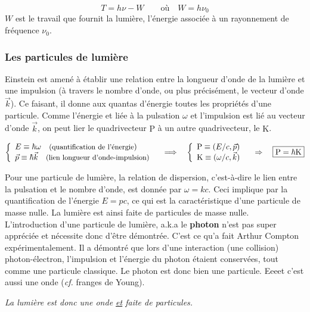 \documentclass[12pt, a4paper]{book}
\begin{document}
$$ T = h\nu - W \qquad \text{où} \quad W = h\nu_0 $$
$W$ est le travail que fournit la lumière, l'énergie associée à un rayonnement de fréquence $\nu_0$.

\subsubsection{Les particules de lumière}
Einstein est amené à établir une relation entre la longueur d'onde de la lumière et une impulsion (à travers le nombre d'onde, ou plus précisément, le vecteur d'onde $\vec{k}$). Ce faisant, il donne aux quantas d'énergie toutes les propriétés d'une particule. Comme l'énergie et liée à la pulsation $\omega$ et l'impulsion est lié au vecteur d'onde $\vec{k}$, on peut lier le quadrivecteur $\mathrm{P}$ à un autre quadrivecteur, le  $\mathrm{K}$.
\begin{center}
$\left\{ \begin{array}{l}
E \equiv \hbar \omega \quad \text{\small (quantification de l'énergie}) \\
\vec{p} \equiv \hbar \vec{k}  \quad \text{\small (lien longueur d'onde-impulsion)}
\end{array} \right.
\quad \Longrightarrow \quad 
\left\{ \begin{array}{l}
\mathrm{P} \equiv (E/c, \vec{p}) \\
\mathrm{K} \equiv (\omega/c, \vec{k})
\end{array} \right. \quad \Rightarrow \quad \boxed{\mathrm{P} = \hbar \mathrm{K}}$
\end{center}
Pour une particule de lumière, la relation de dispersion, c'est-à-dire le lien entre la pulsation et le nombre d'onde, est donnée par  $\omega = kc$. Ceci implique par la quantification de l'énergie $E = pc$, ce qui est la caractéristique d'une particule de masse nulle. La lumière est ainsi faite de particules de masse nulle. \\

L'introduction d'une particule de lumière, a.k.a le \textbf{photon} n'est pas super appréciée et nécessite donc d'être démontrée. C'est ce qu'a fait Arthur Compton expérimentalement. Il a démontré que lors d'une interaction (une collision) photon-électron, l'impulsion et l'énergie du photon étaient conservées, tout comme une particule classique. Le photon est donc bien une particule. Eeeet c'est aussi une onde (\textit{cf.} franges de Young). 
\begin{center}
\begin{large}
\textit{La lumière est donc une onde \underline{et} faite de particules.}
\end{large}
\end{center}
\end{document}
